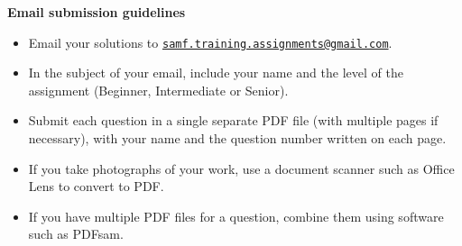 \documentclass{article}
\begin{document}
\vfill
\textbf{\Large Email submission guidelines}
\begin{itemize}
	\item Email your solutions to \href{mailto:samf.training.assignments@gmail.com}{\texttt{samf.training.assignments@gmail.com}}.
	\item In the subject of your email, include your name and the level of the assignment (Beginner, Intermediate or Senior).
	\item Submit each question in a single separate PDF file (with multiple pages if necessary), with your name and the question number written on each page.
	\item If you take photographs of your work, use a document scanner such as Office Lens to convert to PDF.
	\item If you have multiple PDF files for a question, combine them using software such as PDFsam.
\end{itemize}
\end{document}
